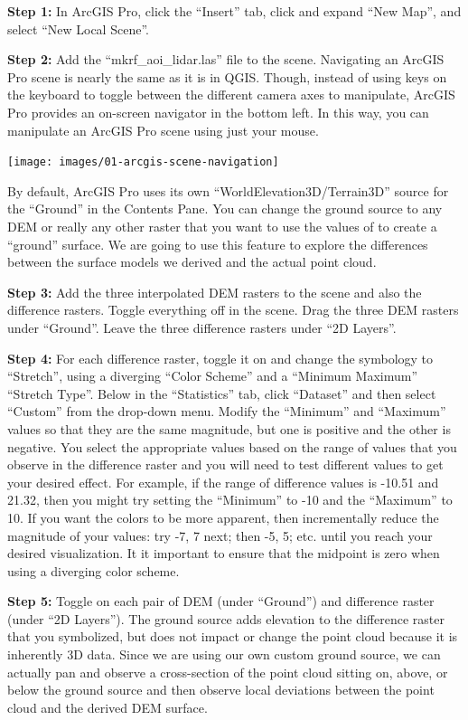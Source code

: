 \documentclass[
]{book}
\begin{document}
\textbf{Step 1:} In ArcGIS Pro, click the ``Insert'' tab, click and expand ``New Map'', and select ``New Local Scene''.

\textbf{Step 2:} Add the ``mkrf\_aoi\_lidar.las'' file to the scene. Navigating an ArcGIS Pro scene is nearly the same as it is in QGIS. Though, instead of using keys on the keyboard to toggle between the different camera axes to manipulate, ArcGIS Pro provides an on-screen navigator in the bottom left. In this way, you can manipulate an ArcGIS Pro scene using just your mouse.

\texttt{[image: images/01-arcgis-scene-navigation]}

By default, ArcGIS Pro uses its own ``WorldElevation3D/Terrain3D'' source for the ``Ground'' in the Contents Pane. You can change the ground source to any DEM or really any other raster that you want to use the values of to create a ``ground'' surface. We are going to use this feature to explore the differences between the surface models we derived and the actual point cloud.

\textbf{Step 3:} Add the three interpolated DEM rasters to the scene and also the difference rasters. Toggle everything off in the scene. Drag the three DEM rasters under ``Ground''. Leave the three difference rasters under ``2D Layers''.

\textbf{Step 4:} For each difference raster, toggle it on and change the symbology to ``Stretch'', using a diverging ``Color Scheme'' and a ``Minimum Maximum'' ``Stretch Type''. Below in the ``Statistics'' tab, click ``Dataset'' and then select ``Custom'' from the drop-down menu. Modify the ``Minimum'' and ``Maximum'' values so that they are the same magnitude, but one is positive and the other is negative. You select the appropriate values based on the range of values that you observe in the difference raster and you will need to test different values to get your desired effect. For example, if the range of difference values is -10.51 and 21.32, then you might try setting the ``Minimum'' to -10 and the ``Maximum'' to 10. If you want the colors to be more apparent, then incrementally reduce the magnitude of your values: try -7, 7 next; then -5, 5; etc. until you reach your desired visualization. It it important to ensure that the midpoint is zero when using a diverging color scheme.

\textbf{Step 5:} Toggle on each pair of DEM (under ``Ground'') and difference raster (under ``2D Layers''). The ground source adds elevation to the difference raster that you symbolized, but does not impact or change the point cloud because it is inherently 3D data. Since we are using our own custom ground source, we can actually pan and observe a cross-section of the point cloud sitting on, above, or below the ground source and then observe local deviations between the point cloud and the derived DEM surface.
\end{document}
